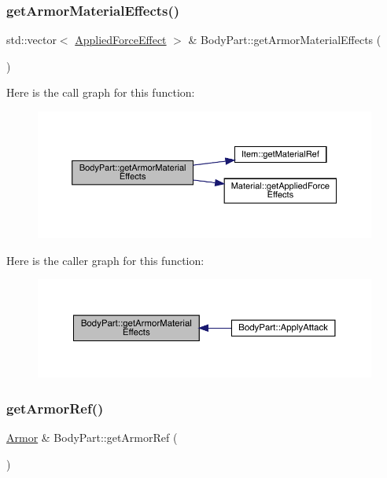 \subsubsection{\texorpdfstring{get\+Armor\+Material\+Effects()}{getArmorMaterialEffects()}}
{\footnotesize\ttfamily std\+::vector$<$ \mbox{\hyperlink{struct_applied_force_effect}{Applied\+Force\+Effect}} $>$ \& Body\+Part\+::get\+Armor\+Material\+Effects (\begin{DoxyParamCaption}{ }\end{DoxyParamCaption})}

Here is the call graph for this function\+:
\nopagebreak
\begin{figure}[H]
\begin{center}
\leavevmode
\includegraphics[width=350pt]{class_body_part_a7c4d742811e49a2c97b9bec6c1785e94_cgraph}
\end{center}
\end{figure}
Here is the caller graph for this function\+:
\nopagebreak
\begin{figure}[H]
\begin{center}
\leavevmode
\includegraphics[width=350pt]{class_body_part_a7c4d742811e49a2c97b9bec6c1785e94_icgraph}
\end{center}
\end{figure}
\mbox{\label{class_body_part_a0398943f64891c99b3a05f20baeccd55}} 
\subsubsection{\texorpdfstring{get\+Armor\+Ref()}{getArmorRef()}}
{\footnotesize\ttfamily \mbox{\hyperlink{class_armor}{Armor}} \& Body\+Part\+::get\+Armor\+Ref (\begin{DoxyParamCaption}{ }\end{DoxyParamCaption})}

